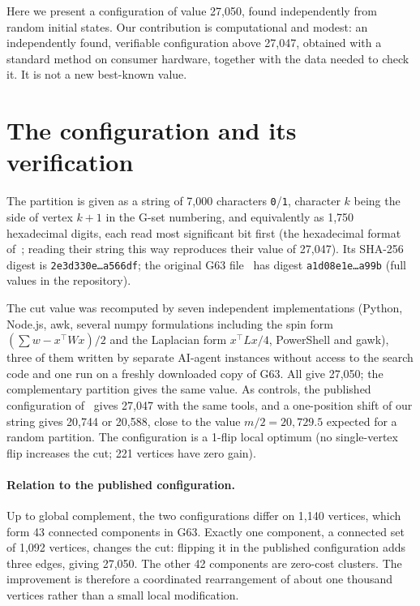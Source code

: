 \documentclass[11pt]{article}
\begin{document}
Here we present a configuration of value 27,050, found independently from random initial states. Our contribution is computational
and modest: an independently found, verifiable configuration above 27,047, obtained with a standard method on consumer hardware,
together with the data needed to check it. It is not a new best-known value.

\section{The configuration and its verification}
The partition is given as a string of 7,000 characters \texttt{0}/\texttt{1}, character $k$ being the side of vertex $k+1$ in the
G-set numbering, and equivalently as 1,750 hexadecimal digits, each read most significant bit first (the hexadecimal format of~\cite{khan2025};
reading their string this way reproduces their value of 27,047).
Its SHA-256 digest is \texttt{2e3d330e\ldots a566df}; the original G63 file~\cite{gset} has digest \texttt{a1d08e1e\ldots a99b}
(full values in the repository).

The cut value was recomputed by seven independent implementations (Python, Node.js, awk, several numpy formulations including the spin form
$(\sum w - x^{\top}Wx)/2$ and the Laplacian form $x^{\top}Lx/4$, PowerShell and gawk), three of them written by separate AI-agent instances
without access to the search code and one run on a freshly downloaded copy of G63. All give 27,050; the complementary partition
gives the same value. As controls, the published configuration of~\cite{khan2025} gives 27,047 with the same tools, and a
one-position shift of our string gives 20,744 or 20,588, close to the value $m/2 = 20{,}729.5$ expected for a random partition.
The configuration is a 1-flip local optimum (no single-vertex flip increases the cut; 221 vertices have zero gain).

\paragraph{Relation to the published configuration.}
Up to global complement, the two configurations differ on 1,140 vertices, which form 43 connected components in G63.
Exactly one component, a connected set of 1,092 vertices, changes the cut: flipping it in the published configuration adds
three edges, giving 27,050. The other 42 components are zero-cost clusters. The improvement is therefore a coordinated
rearrangement of about one thousand vertices rather than a small local modification.
\end{document}
